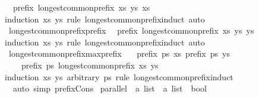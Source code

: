 \begin{isabellebody}
\ \ {\isachardoublequoteopen}prefix\ {\isacharparenleft}longest{\isacharunderscore}common{\isacharunderscore}prefix\ xs\ ys{\isacharparenright}\ xs{\isachardoublequoteclose}\isanewline
%
\isadelimproof
%
\endisadelimproof
%
\isatagproof
{}\isamarkupfalse%
{\isacharparenleft}induction\ xs\ ys\ rule{\isacharcolon}\ longest{\isacharunderscore}common{\isacharunderscore}prefix{\isachardot}induct{\isacharparenright}\ auto%
\endisatagproof
{\isafoldproof}%
%
\isadelimproof
\isanewline
%
\endisadelimproof
\isanewline
{}\isamarkupfalse%
\ longest{\isacharunderscore}common{\isacharunderscore}prefix{\isacharunderscore}prefix{}{\isacharcolon}\isanewline
\ \ {\isachardoublequoteopen}prefix\ {\isacharparenleft}longest{\isacharunderscore}common{\isacharunderscore}prefix\ xs\ ys{\isacharparenright}\ ys{\isachardoublequoteclose}\isanewline
%
\isadelimproof
%
\endisadelimproof
%
\isatagproof
{}\isamarkupfalse%
{\isacharparenleft}induction\ xs\ ys\ rule{\isacharcolon}\ longest{\isacharunderscore}common{\isacharunderscore}prefix{\isachardot}induct{\isacharparenright}\ auto%
\endisatagproof
{\isafoldproof}%
%
\isadelimproof
\isanewline
%
\endisadelimproof
\isanewline
{}\isamarkupfalse%
\ longest{\isacharunderscore}common{\isacharunderscore}prefix{\isacharunderscore}max{\isacharunderscore}prefix{\isacharcolon}\isanewline
\ \ {\isachardoublequoteopen}{\isasymlbrakk}\ prefix\ ps\ xs{\isacharsemicolon}\ prefix\ ps\ ys\ {\isasymrbrakk}\isanewline
\ \ \ {\isasymLongrightarrow}\ prefix\ ps\ {\isacharparenleft}longest{\isacharunderscore}common{\isacharunderscore}prefix\ xs\ ys{\isacharparenright}{\isachardoublequoteclose}\isanewline
%
\isadelimproof
%
\endisadelimproof
%
\isatagproof
{}\isamarkupfalse%
{\isacharparenleft}induction\ xs\ ys\ arbitrary{\isacharcolon}\ ps\ rule{\isacharcolon}\ longest{\isacharunderscore}common{\isacharunderscore}prefix{\isachardot}induct{\isacharparenright}\isanewline
\ \ {\isacharparenleft}auto\ simp{\isacharcolon}\ prefix{\isacharunderscore}Cons{\isacharparenright}%
\endisatagproof
{\isafoldproof}%
%
\isadelimproof
%
\endisadelimproof
%
\isadelimdocument
%
\endisadelimdocument
%
\isatagdocument
%
\isamarkuptrue%
%
\endisatagdocument
{\isafolddocument}%
%
\isadelimdocument
%
\endisadelimdocument
{}\isamarkupfalse%
\ parallel\ {\isacharcolon}{\isacharcolon}\ {\isachardoublequoteopen}{\isacharprime}a\ list\ {\isasymRightarrow}\ {\isacharprime}a\ list\ {\isasymRightarrow}\ bool{\isachardoublequoteclose}\ \ {\isacharparenleft}\ {\isachardoublequoteopen}{\isasymparallel}{\isachardoublequoteclose}\ {}{}{\isacharparenright}\isanewline

\end{isabellebody}
